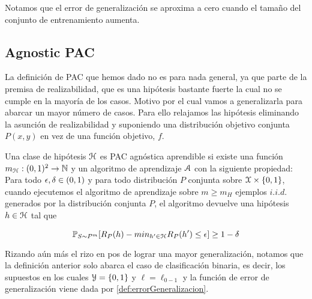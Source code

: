     \begin{observacion}
    Notamos que el error de generalización se aproxima a cero cuando el tamaño del conjunto de entrenamiento aumenta.
    \end{observacion}
    
    
    
    
    
    
    \subsection{Agnostic PAC}
        La definición de PAC que hemos dado no es para nada general, ya que parte de la premisa de realizabilidad, que es una hipótesis bastante fuerte la cual no se cumple en la mayoría de los casos. Motivo por el cual vamos a generalizarla para abarcar un mayor número de casos. Para ello relajamos las hipótesis eliminando la asunción de realizabilidad y suponiendo una distribución objetivo conjunta $P(x,y)$ en vez de una función objetivo, $f$.\\
    
        \begin{definicion}
         Una clase de hipótesis $\mathcal{H}$ es PAC agnóstica aprendible si existe una función $m_{\mathcal{H}}:(0,1)^2 \to \mathbb{N}$ y un algoritmo de aprendizaje $\mathcal{A}$ con la siguiente propiedad: Para todo $\epsilon, \delta \in (0,1)$ y para todo distribución $P$ conjunta sobre $\mathcal{X} \times 
         \{0,1\}$, cuando ejecutemos el algoritmo de aprendizaje sobre $m \geq m_{H}$ ejemplos $i.i.d.$ generados por la distribución conjunta $P$, el algoritmo devuelve una hipótesis $h \in \mathcal{H}$ tal que 
         
         \begin{equation}
             \mathbb{P}_{S \sim P^m}[R_P(h) - min_{h' \in \mathcal{H}}R_P(h') \leq \epsilon] \geq 1 - \delta
         \end{equation}
                
         \end{definicion}
                
        
        Rizando aún más el rizo en pos de lograr una mayor generalización, notamos que la definición anterior solo abarca el caso de clasificación binaria, es decir, los supuestos en los cuales $\mathcal{Y} = \{0,1\}$ y $\ell = \ell_{0-1}$ y la función de error de generalización viene dada por \ref{def:errorGeneralizacion}. 
        
